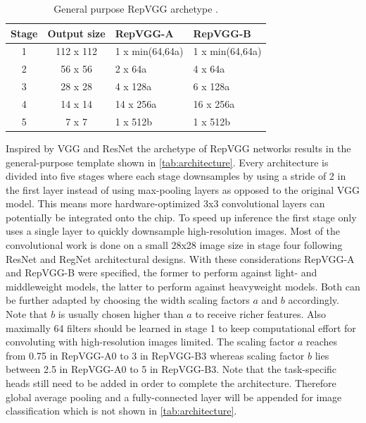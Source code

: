 \begin{table}
	\begin{center}
		\begin{tabular}{c|c|l|l} 
			\hline
			Stage & Output size & RepVGG-A & RepVGG-B \\
			\hline
			1 & 112 x 112 & 1 x min(64,64a) & 1 x min(64,64a) \\
			2 & 56 x 56 & 2 x 64a & 4 x 64a \\
			3 & 28 x 28 & 4 x 128a & 6 x 128a \\
			4 & 14 x 14 & 14 x 256a & 16 x 256a \\
			5 & 7 x 7 & 1 x 512b & 1 x 512b \\
			\hline
		\end{tabular}
	\end{center}
	\caption{General purpose RepVGG archetype \cite{XiaohanDing.2021}.}
	\label{tab:architecture}
\end{table}

Inspired by VGG \cite{KarenSimonyan.2014} and ResNet \cite{KaimingHe.2015} the archetype of RepVGG networks results in the general-purpose template shown in \autoref{tab:architecture}. Every architecture is divided into five stages where each stage downsamples by using a stride of 2 in the first layer instead of using max-pooling layers as opposed to the original VGG model. This means more hardware-optimized 3x3 convolutional layers can potentially be integrated onto the chip. To speed up inference the first stage only uses a single layer to quickly downsample high-resolution images. Most of the convolutional work is done on a small 28x28 image size in stage four following ResNet \cite{KaimingHe.2015} and RegNet \cite{IlijaRadosavovic.2020} architectural designs. With these considerations RepVGG-A and RepVGG-B were specified, the former to perform against light- and middleweight models, the latter to perform against heavyweight models. Both can be further adapted by choosing the width scaling factors $a$ and $b$ accordingly. Note that $b$ is usually chosen higher than $a$ to receive richer features. Also maximally 64 filters should be learned in stage 1 to keep computational effort for convoluting with high-resolution images limited. The scaling factor $a$ reaches from 0.75 in RepVGG-A0 to 3 in RepVGG-B3 whereas scaling factor $b$ lies between 2.5 in RepVGG-A0 to 5 in RepVGG-B3. Note that the task-specific heads still need to be added in order to complete the architecture. Therefore global average pooling and a fully-connected layer will be appended for image classification which is not shown in \autoref{tab:architecture}. 


